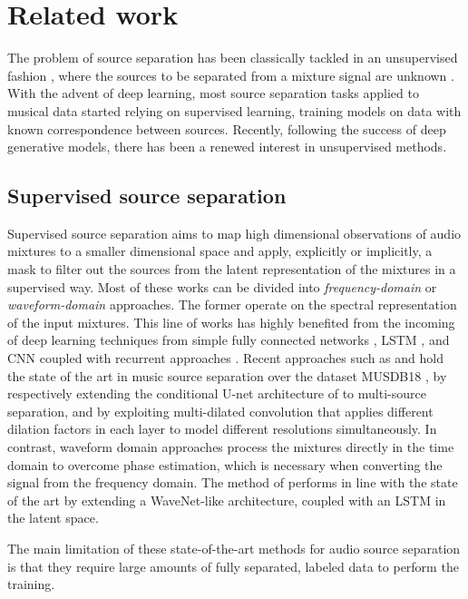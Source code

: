 \documentclass[a4paper]{article}
\begin{document}
 \section{Related work}
\label{sec:related}

The problem of source separation has been classically tackled in an unsupervised fashion \cite{comon:1994}, where the sources to be separated from a mixture signal are unknown \cite{Smaragdis:2014}.
With the advent of deep learning, most source separation tasks applied to musical data started relying on supervised learning, training models on data with known correspondence between sources. Recently, following the success of deep generative models, there has been a renewed interest in unsupervised methods.
\subsection{Supervised source separation}
Supervised source separation aims to map high dimensional observations of audio mixtures to a smaller dimensional space and apply, explicitly or implicitly, a mask to filter out the sources from the latent representation of the mixtures in a supervised way.
Most of these works can be divided into \emph{frequency-domain} or \emph{waveform-domain} approaches. 
The former \cite{Roweis:2000} operate on the spectral representation of the input mixtures.
This line of works has highly benefited from  the incoming of deep learning techniques from simple fully connected networks \cite{Uhlich:2015}, LSTM \cite{Uhlich:2017}, and CNN coupled with recurrent approaches \cite{liu:2018,Takashi2018}.
Recent approaches such as \cite{choi:2020} and \cite{takahashi:2020} hold the state of the art in music source separation over the dataset MUSDB18 \cite{musdb18}, by respectively extending the conditional U-net architecture of \cite{meseguer-brocal2019} to  multi-source  separation, and by exploiting multi-dilated convolution that applies different dilation factors in each layer to model different resolutions simultaneously.
In contrast, waveform domain approaches process the mixtures directly in the time domain to overcome phase estimation, which is necessary when converting the signal from the frequency domain. The method of \cite{defossez2019} performs in line with the state of the art by extending a WaveNet-like architecture, coupled with an LSTM in the latent space.

The main limitation of these state-of-the-art methods for audio source separation is that they require large amounts of fully separated, labeled data to perform the training.
\end{document}
